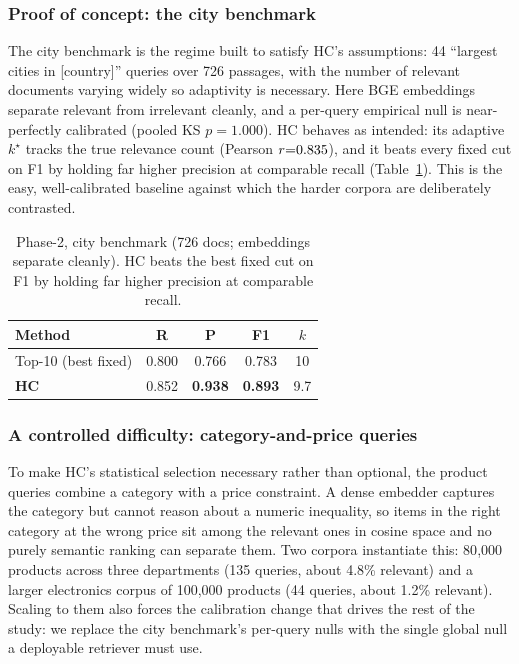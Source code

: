 \documentclass[letterpaper]{article} %
\begin{document}
\subsubsection{Proof of concept: the city benchmark}
The city benchmark is the regime built to satisfy HC's assumptions: 44
``largest cities in [country]'' queries over 726 passages, with the
number of relevant documents varying widely so adaptivity is necessary.
Here BGE \citep{bgeembeddings2023} embeddings separate relevant from
irrelevant cleanly, and a per-query empirical null is near-perfectly
calibrated (pooled KS $p{=}1.000$). HC behaves as intended: its adaptive
$k^\star$ tracks the true relevance count (Pearson $r{=}0.835$), and
it beats every fixed cut on F1 by holding far higher precision at
comparable recall (Table~\ref{tab:p2city}). This is the easy,
well-calibrated baseline against which the harder corpora are
deliberately contrasted.

\begin{table}[t]
\centering\small
\setlength{\extrarowheight}{1.5pt}
\begin{tabular}{|l|c|c|c|c|}
\hline
\textbf{Method} & \textbf{R} & \textbf{P} & \textbf{F1} & \textbf{$k$} \\
\hline
Top-10 (best fixed) & 0.800 & 0.766 & 0.783 & 10 \\
\hline
\textbf{HC} & 0.852 & \textbf{0.938} & \textbf{0.893} & 9.7 \\
\hline
\end{tabular}
\caption{Phase-2, city benchmark (726 docs; embeddings separate cleanly).
HC beats the best fixed cut on F1 by holding far higher precision at
comparable recall.}
\label{tab:p2city}
\end{table}

\subsubsection{A controlled difficulty: category-and-price queries}
To make HC's statistical selection necessary rather than optional, the
product queries combine a category with a price constraint. A dense
embedder captures the category but cannot reason about a numeric
inequality, so items in the right category at the wrong price sit among
the relevant ones in cosine space and no purely semantic ranking can
separate them. Two corpora instantiate this: 80{,}000 products across
three departments (135 queries, about 4.8\% relevant) and a larger
electronics corpus of 100{,}000 products (44 queries, about 1.2\%
relevant). Scaling to them also forces the calibration change that drives
the rest of the study: we replace the city benchmark's per-query nulls
with the single global null a deployable retriever must use.
\end{document}
